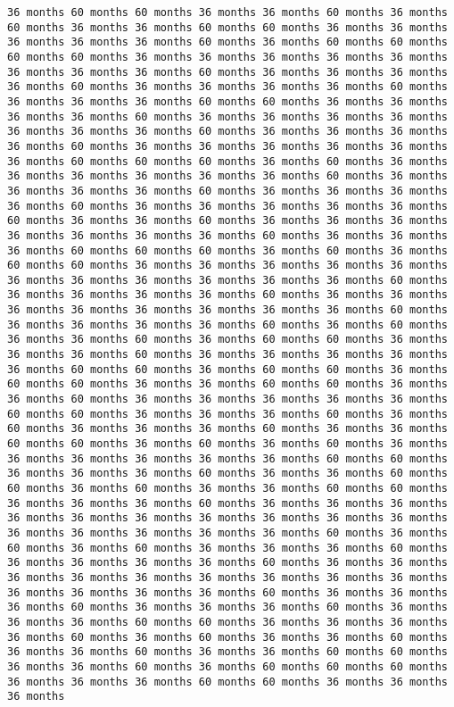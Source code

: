 \documentclass[11pt]{article}
\begin{document}
\begin{Verbatim}[commandchars=\\\{\}, frame=single, framerule=2mm, rulecolor=\color{outerrorbackground}]
36 months 60 months 60 months 36 months 36 months 60 months 36 months 60 months 36 months 36 months 60 months 60 months 36 months 36 months 36 months 36 months 36 months 60 months 36 months 60 months 60 months 60 months 60 months 36 months 36 months 36 months 36 months 36 months 36 months 36 months 36 months 60 months 36 months 36 months 36 months 36 months 60 months 36 months 36 months 36 months 36 months 60 months 36 months 36 months 36 months 60 months 60 months 36 months 36 months 36 months 36 months 60 months 36 months 36 months 36 months 36 months 36 months 36 months 36 months 60 months 36 months 36 months 36 months 36 months 60 months 36 months 36 months 36 months 36 months 36 months 36 months 60 months 60 months 60 months 36 months 60 months 36 months 36 months 36 months 36 months 36 months 36 months 60 months 36 months 36 months 36 months 36 months 60 months 36 months 36 months 36 months 36 months 60 months 36 months 36 months 36 months 36 months 36 months 60 months 36 months 36 months 60 months 36 months 36 months 36 months 36 months 36 months 36 months 36 months 60 months 36 months 36 months 36 months 60 months 60 months 60 months 36 months 60 months 36 months 60 months 60 months 36 months 36 months 36 months 36 months 36 months 36 months 36 months 36 months 36 months 36 months 36 months 60 months 36 months 36 months 36 months 36 months 60 months 36 months 36 months 36 months 36 months 36 months 36 months 36 months 36 months 60 months 36 months 36 months 36 months 36 months 60 months 36 months 60 months 36 months 36 months 60 months 36 months 60 months 60 months 36 months 36 months 36 months 60 months 36 months 36 months 36 months 36 months 36 months 60 months 60 months 36 months 60 months 60 months 36 months 60 months 60 months 36 months 36 months 60 months 60 months 36 months 36 months 60 months 36 months 36 months 36 months 36 months 36 months 60 months 60 months 36 months 36 months 36 months 60 months 36 months 60 months 36 months 36 months 36 months 60 months 36 months 36 months 60 months 60 months 36 months 60 months 36 months 60 months 36 months 36 months 36 months 36 months 36 months 36 months 60 months 60 months 36 months 36 months 36 months 60 months 36 months 36 months 60 months 60 months 36 months 60 months 36 months 36 months 60 months 60 months 36 months 36 months 36 months 60 months 36 months 36 months 36 months 36 months 36 months 36 months 36 months 36 months 36 months 36 months 36 months 36 months 36 months 36 months 36 months 60 months 36 months 60 months 36 months 60 months 36 months 36 months 36 months 60 months 36 months 36 months 36 months 36 months 60 months 36 months 36 months 36 months 36 months 36 months 36 months 36 months 36 months 36 months 36 months 36 months 36 months 36 months 60 months 36 months 36 months 36 months 60 months 36 months 36 months 36 months 60 months 36 months 36 months 36 months 60 months 60 months 36 months 36 months 36 months 36 months 60 months 36 months 60 months 36 months 36 months 60 months 36 months 36 months 60 months 36 months 36 months 60 months 60 months 36 months 36 months 60 months 36 months 60 months 60 months 60 months 36 months 36 months 36 months 60 months 60 months 36 months 36 months 36 months 
\end{Verbatim}
\end{document}

